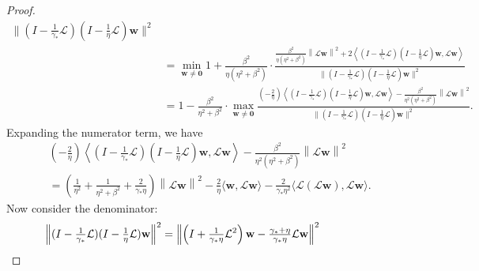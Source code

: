 \documentclass[a4paper,10pt]{article}
\begin{document}
\begin{proof}
\begin{align}
	{\|(I - \tfrac{1}{{\gamma_*}}\mathcal{L})(I - \tfrac{1}{\eta}\mathcal{L})\mathbf{w}\|^2} \nonumber\\
& = \min_{\mathbf{w}\neq\mathbf{0}} 1 +
	\frac{\beta^2}{\eta(\eta^2+\beta^2)}\cdot 
	\frac{\frac{\beta^2}{\eta(\eta^2+\beta^2)}\left\|\mathcal{L}\mathbf{w} \right\|^2
		+ 2\left\langle(I - \tfrac{1}{{\gamma_*}}\mathcal{L})(I - \tfrac{1}{\eta}\mathcal{L})\mathbf{w},
		\mathcal{L}\mathbf{w} \right\rangle}
	{\|(I - \tfrac{1}{{\gamma_*}}\mathcal{L})(I - \tfrac{1}{\eta}\mathcal{L})\mathbf{w}\|^2} \nonumber\\
& = 1 - \frac{\beta^2}{\eta^2+\beta^2} \cdot\max_{\mathbf{w}\neq\mathbf{0}}
	\frac{(-\tfrac{2}{\eta})\left\langle(I - \tfrac{1}{{\gamma_*}}\mathcal{L})(I -
		\tfrac{1}{\eta}\mathcal{L})\mathbf{w},
		\mathcal{L}\mathbf{w} \right\rangle- 
		\frac{\beta^2}{\eta^2(\eta^2+\beta^2)}\left\|\mathcal{L}\mathbf{w} \right\|^2}
	{\|(I - \tfrac{1}{{\gamma_*}}\mathcal{L})(I - \tfrac{1}{\eta}\mathcal{L})\mathbf{w}\|^2}.
	\label{eq:gen_smin}
\end{align}
%
Expanding the numerator term, we have
{\small
\begin{align}\nonumber
& (-\tfrac{2}{\eta})\left\langle(I - \tfrac{1}{{\gamma_*}}\mathcal{L})(I -
	\tfrac{1}{\eta}\mathcal{L})\mathbf{w}, \mathcal{L}\mathbf{w} \right\rangle- 
		\frac{\beta^2}{\eta^2(\eta^2+\beta^2)}\left\|\mathcal{L}\mathbf{w} \right\|^2 \\
& = \left(\frac{1}{\eta^2} + \frac{1}{\eta^2+\beta^2} + \frac{2}{{\gamma_*}\eta}\right)
			\left\|\mathcal{L}\mathbf{w} \right\|^2
		- \frac{2}{\eta}\langle\mathbf{w},\mathcal{L}\mathbf{w}\rangle
		- \frac{2}{{\gamma_*}\eta^2}\langle\mathcal{L}(\mathcal{L}\mathbf{w}),\mathcal{L}\mathbf{w}\rangle.
		\label{eq:num_gen}
\end{align}
}
%
Now consider the denominator:
%
\begin{align}
& \hspace{-10ex}
\left\|(I - \tfrac{1}{{\gamma_*}}\mathcal{L})(I - \tfrac{1}{\eta}\mathcal{L})\mathbf{w}\right\|^2
= \left\|\left(I + \tfrac{1}{{\gamma_*}\eta}\mathcal{L}^2\right)\mathbf{w} - 
	\tfrac{{\gamma_*}+\eta}{{\gamma_*}\eta}\mathcal{L}\mathbf{w}\right\|^2 \nonumber\\

\end{align}
\end{proof}
\end{document}
